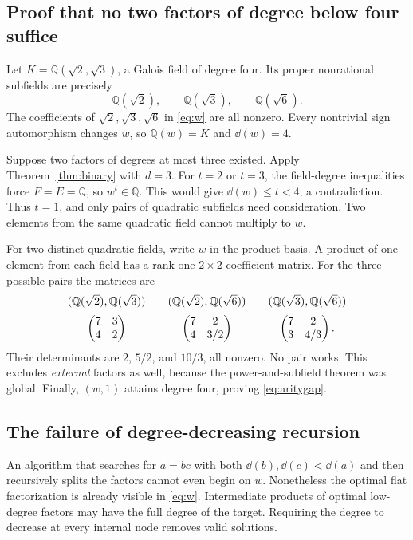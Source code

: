 \documentclass[11pt,a4paper]{article}
\theoremstyle{definition}\newtheorem{definition}[theorem]{Definition}
\theoremstyle{remark}\newtheorem{remark}[theorem]{Remark}
\newcommand{\Q}{\mathbb Q}\newcommand{\C}{\mathbb C}\newcommand{\Z}{\mathbb Z}
\begin{document}
\subsection{Proof that no two factors of degree below four suffice}
Let $K=\Q(\sqrt2,\sqrt3)$, a Galois field of degree four. Its proper nonrational subfields are precisely
\[
 \Q(\sqrt2),\qquad\Q(\sqrt3),\qquad\Q(\sqrt6).
\]
The coefficients of $\sqrt2,\sqrt3,\sqrt6$ in \eqref{eq:w} are all nonzero. Every nontrivial sign automorphism changes $w$, so $\Q(w)=K$ and $\dd(w)=4$.

Suppose two factors of degrees at most three existed. Apply Theorem~\ref{thm:binary} with $d=3$. For $t=2$ or $t=3$, the field-degree inequalities force $F=E=\Q$, so $w^t\in\Q$. This would give $\dd(w)\le t<4$, a contradiction. Thus $t=1$, and only pairs of quadratic subfields need consideration. Two elements from the same quadratic field cannot multiply to $w$.

For two distinct quadratic fields, write $w$ in the product basis. A product of one element from each field has a rank-one $2\times2$ coefficient matrix. For the three possible pairs the matrices are
\[
 \begin{array}{c@{\qquad}c@{\qquad}c}
 (\Q(\sqrt2),\Q(\sqrt3))&
 (\Q(\sqrt2),\Q(\sqrt6))&
 (\Q(\sqrt3),\Q(\sqrt6))\\[2mm]
 \begin{pmatrix}7&3\\4&2\end{pmatrix}&
 \begin{pmatrix}7&2\\4&3/2\end{pmatrix}&
 \begin{pmatrix}7&2\\3&4/3\end{pmatrix}.
 \end{array}
\]
Their determinants are $2$, $5/2$, and $10/3$, all nonzero. No pair works. This excludes \emph{external} factors as well, because the power-and-subfield theorem was global. Finally, $(w,1)$ attains degree four, proving \eqref{eq:aritygap}.

\subsection{The failure of degree-decreasing recursion}
An algorithm that searches for $a=bc$ with both $\dd(b),\dd(c)<\dd(a)$ and then recursively splits the factors cannot even begin on $w$. Nonetheless the optimal flat factorization is already visible in \eqref{eq:w}. Intermediate products of optimal low-degree factors may have the full degree of the target. Requiring the degree to decrease at every internal node removes valid solutions.
\end{document}
